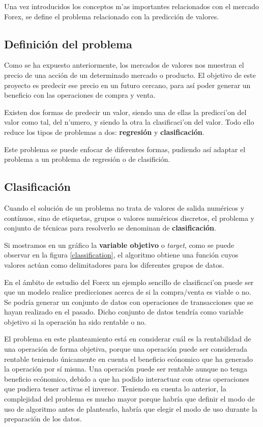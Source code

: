 Una vez introducidos los conceptos m'as importantes relacionados con el mercado Forex, se define el problema relacionado con la predicción de valores.

\subsection{Definici\'on del problema}

Como se ha expuesto anteriormente, los mercados de valores nos muestran el precio de una acción de un determinado mercado o producto. El objetivo de este proyecto es predecir ese precio en un futuro cercano, para así poder generar un beneficio con las operaciones de compra y venta.

Existen dos formas de predecir un valor, siendo una de ellas la predicci'on del valor como tal, del n'umero, y siendo la otra la clasificaci'on del valor. Todo ello reduce los tipos de problemas a dos: \textbf{regresión} y \textbf{clasificación}. 

Este problema se puede enfocar de diferentes formas, pudiendo así adaptar el problema a un problema de regresión o de clasifición.

\subsection{Clasificaci\'on}
Cuando el solución de un problema no trata de valores de salida numéricos y contínuos, sino de etiquetas, grupos o valores numéricos discretos, el problema y conjunto de técnicas para resolverlo se denominan de \textbf{clasificación}.

Si mostramos en un gráfico la \textbf{variable objetivo} o \textit{target}, como se puede observar en la figura \ref{classification}, el algoritmo obtiene una función cuyos valores actúan como delimitadores para los diferentes grupos de datos.


En el ámbito de estudio del Forex un ejemplo sencillo de clasificaci'on puede ser que un modelo realice predicciones acerca de si la compra/venta es viable o no. Se podría generar un conjunto de datos con operaciones de transacciones que se hayan realizado en el pasado. Dicho conjunto de datos tendría como variable objetivo si la operación ha sido rentable o no. 

El problema en este planteamiento está en considerar cuál es la rentabilidad de una operación de forma objetiva, porque una operación puede ser considerada rentable teniendo únicamente en cuenta el beneficio ecónomico que ha generado la operación por sí misma. Una operación puede ser rentable aunque no tenga beneficio ecónomico, debido a que ha podido interactuar con otras operaciones que pudiera tener activas el inversor. Teniendo en cuenta lo anterior,  la complejidad del problema es mucho mayor porque habría que definir el modo de uso de algoritmo antes de plantearlo, habría que elegir el modo de uso durante la preparación de los datos.

